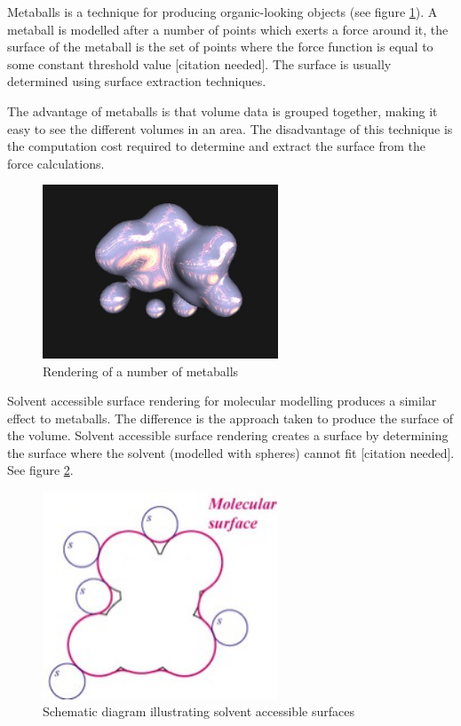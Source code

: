
Metaballs is a technique for producing organic-looking objects (see figure
\ref{fig:background_metaballs}). A metaball is modelled after a number of
points which exerts a force around it, the surface of the metaball is the set
of points where the force function is equal to some constant threshold value
[citation needed]. The surface is usually determined using surface extraction
techniques.

The advantage of metaballs is that volume data is grouped together, making it
easy to see the different volumes in an area. The disadvantage of this
technique is the computation cost required to determine and extract the surface
from the force calculations.

\begin{figure}[h!]
  \begin{center}
    \includegraphics[width=70mm]{metaballs}
  \end{center}
  \caption{Rendering of a number of metaballs}
  \label{fig:background_metaballs}
\end{figure}

Solvent accessible surface rendering for molecular modelling produces a similar
effect to metaballs. The difference is the approach taken to produce the
surface of the volume. Solvent accessible surface rendering creates a surface
by determining the surface where the solvent (modelled with spheres) cannot fit
[citation needed]. See figure \ref{fig:background_sas}.

\begin{figure}[h!]
  \begin{center}
    \includegraphics[width=70mm]{sas_ms}
  \end{center}
  \caption{Schematic diagram illustrating solvent accessible surfaces}
  \label{fig:background_sas}
\end{figure}

